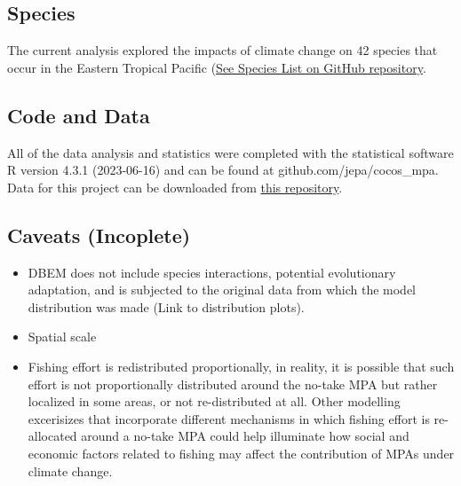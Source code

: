 \documentclass[
]{article}
\providecommand{\tightlist}{%
  \setlength{\itemsep}{0pt}\setlength{\parskip}{0pt}}
\begin{document}
\hypertarget{species-1}{%
\subsection{Species}\label{species-1}}

The current analysis explored the impacts of climate change on 42 species that occur in the Eastern Tropical Pacific (\href{https://github.com/jepa/cocos_mpa/blob/main/data/species/project_species_list.csv}{See Species List on GitHub repository}.

\hypertarget{code-and-data-1}{%
\subsection{Code and Data}\label{code-and-data-1}}

All of the data analysis and statistics were completed with the statistical software R version 4.3.1 (2023-06-16) and can be found at github.com/jepa/cocos\_mpa. Data for this project can be downloaded from \href{link\%20to\%20data}{this repository}.

\hypertarget{caveats-incoplete-1}{%
\subsection{Caveats (Incoplete)}\label{caveats-incoplete-1}}

\begin{itemize}
\tightlist
\item
  DBEM does not include species interactions, potential evolutionary adaptation, and is subjected to the original data from which the model distribution was made (Link to distribution plots).
\item
  Spatial scale
\item
  Fishing effort is redistributed proportionally, in reality, it is possible that such effort is not proportionally distributed around the no-take MPA but rather localized in some areas, or not re-distributed at all. Other modelling excerisizes that incorporate different mechanisms in which fishing effort is re-allocated around a no-take MPA could help illuminate how social and economic factors related to fishing may affect the contribution of MPAs under climate change.
\end{itemize}
\end{document}
